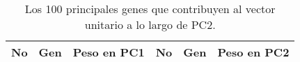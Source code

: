 
\chapter{}\label{apx:apx5}

\begin{table}[!htb]
	\centering
	\caption{Los 100 principales genes que contribuyen al vector unitario a lo largo de PC2.}
	\label{tab:apx5}
	\begin{tabular}{|r|c|c||r|c|c|}
		\hline
		No & Gen & Peso en PC1 & No & Gen & Peso en PC2 \\ \hline
	\end{tabular}
\end{table}